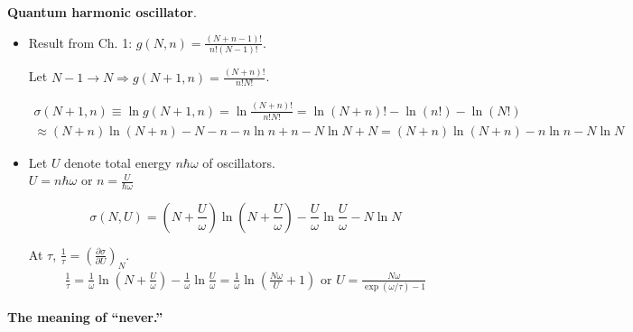   \textbf{Quantum harmonic oscillator}.
\begin{itemize}
\item[(a)]
Result from Ch. 1: $g(N,n) = \frac{ (N+ n -1)! }{ n! (N-1)!}$.  

Let $N-1 \to N \Longrightarrow g(N+1,n) = \frac{ (N+ n )!}{ n! N! }$.  

\[
\begin{gathered}
  \sigma(N+1,n) \equiv \ln{ g(N+1,n) } = \ln{ \frac{ (N+n)! }{ n! N! } } = \ln{ (N+n)! } - \ln{ (n!)} - \ln{ (N!) } \\
  \approx (N+n) \ln{ (N+n)} - N- n - n \ln{ n} + n - N \ln{ N } + N = \boxed{ (N+n) \ln{(N+n)} - n \ln{ n} - N\ln{N } }
\end{gathered}
\]
\item[(b)] Let $U$ denote total energy $n\hbar \omega$ of oscillators.   \\
$U = n \hbar \omega$ or $ n = \frac{ U }{ \hbar \omega}$

\[
\sigma(N, U) = (N + \frac{ U}{ \omega} ) \ln{ ( N + \frac{U }{ \omega}) } - \frac{U}{ \omega} \ln{ \frac{U}{ \omega} } - N \ln{ N}
\]

At $\tau$, $\frac{1}{\tau} = \left( \frac{ \partial \sigma}{ \partial U} \right)_N$.  
\[
\begin{gathered}
  \frac{1}{\tau} = \frac{1}{\omega} \ln{ ( N + \frac{U}{\omega})} - \frac{1}{ \omega} \ln{ \frac{ U}{ \omega} } = \frac{1}{ \omega} \ln{ \left( \frac{ N \omega }{U} + 1 \right) } \text{ or } \boxed{ U = \frac{ N \omega}{ \exp{ ( \omega / \tau) } - 1 }  }
\end{gathered}
\]

\end{itemize}

  \textbf{The meaning of ``never.''}

